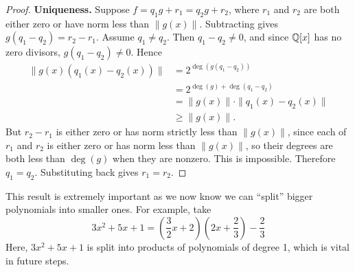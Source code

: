 \begin{proof}
\textbf{Uniqueness.}
Suppose $f=q_1g+r_1=q_2g+r_2$, where $r_1$ and $r_2$ are both either zero or have norm less than $\|g(x)\|$. Subtracting gives $g(q_1-q_2)=r_2-r_1$. Assume $q_1\neq q_2$. Then $q_1-q_2\neq0$, and since $\mathbb{Q}[x]$ has no zero divisors, $g(q_1-q_2)\neq0$. Hence
\[
\begin{aligned}
\|g(x)(q_1(x)-q_2(x))\|
&=2^{\deg(g(q_1-q_2))}\\
&=2^{\deg(g)+\deg(q_1-q_2)}\\
&=\|g(x)\|\cdot\|q_1(x)-q_2(x)\|\\
&\geq\|g(x)\|.
\end{aligned}
\]
But $r_2-r_1$ is either zero or has norm strictly less than $\|g(x)\|$, since each of $r_1$ and $r_2$ is either zero or has norm less than $\|g(x)\|$, so their degrees are both less than $\deg(g)$ when they are nonzero. This is impossible. Therefore $q_1=q_2$. Substituting back gives $r_1=r_2$.
\end{proof}
This result is extremely important as we now know we can ``split'' bigger polynomials into smaller ones. For example, take \[
3x^2+5x+1 = (\frac 3 2x+2)(2x+\frac 2 3 ) - \frac 2 3
\]
Here, $3x^2+5x+1$ is split into products of polynomials of degree 1, which is vital in future steps.